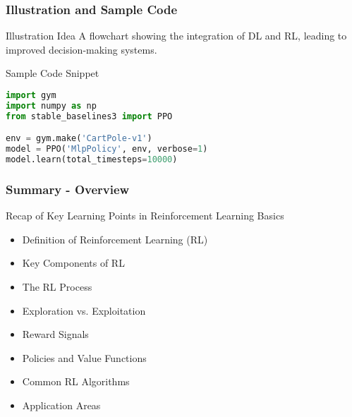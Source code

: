 \documentclass[aspectratio=169]{beamer}
\begin{document}
\begin{frame}[fragile]
    \frametitle{Illustration and Sample Code}
    \begin{block}{Illustration Idea}
        A flowchart showing the integration of DL and RL, leading to improved decision-making systems.
    \end{block}
    \begin{block}{Sample Code Snippet}
        \begin{lstlisting}[language=Python]
import gym
import numpy as np
from stable_baselines3 import PPO

env = gym.make('CartPole-v1')
model = PPO('MlpPolicy', env, verbose=1)
model.learn(total_timesteps=10000)
        \end{lstlisting}
    \end{block}
\end{frame}

\begin{frame}[fragile]
    \frametitle{Summary - Overview}
    \begin{block}{Recap of Key Learning Points in Reinforcement Learning Basics}
        \begin{itemize}
            \item Definition of Reinforcement Learning (RL)
            \item Key Components of RL
            \item The RL Process
            \item Exploration vs. Exploitation
            \item Reward Signals
            \item Policies and Value Functions
            \item Common RL Algorithms
            \item Application Areas
        \end{itemize}
    \end{block}
\end{frame}
\end{document}
